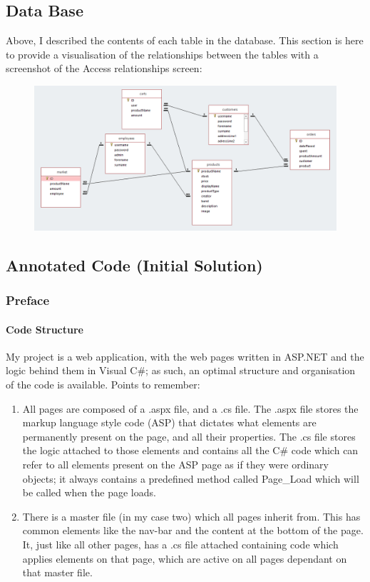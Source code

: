﻿\documentclass{article}
\begin{document}
    \subsection{Data Base}
    Above, I described the contents of each table in the database.
    This section is here to provide a visualisation of the relationships between the tables with a screenshot of the Access relationships screen:
    \begin{figure}[!h]
        \centering
        \includegraphics[width=\textwidth]{dataBaseScreen.png}
    \end{figure}
    \subsection{Annotated Code (Initial Solution)}
    \subsubsection{Preface}
    \paragraph{Code Structure}
    My project is a web application, with the web pages written in ASP.NET and the logic behind them in Visual C\#; as such, an optimal structure and organisation of the code is available.
    Points to remember:
    \begin{enumerate}
        \item All pages are composed of a .aspx file, and a .cs file.
        The .aspx file stores the markup language style code (ASP) that dictates what elements are permanently present on the page, and all their properties.
        The .cs file stores the logic attached to those elements and contains all the C\# code which can refer to all elements present on the ASP page as if they were ordinary objects; it always contains a predefined method called Page\_Load which will be called when the page loads.
        \item There is a master file (in my case two) which all pages inherit from.
        This has common elements like the nav-bar and the content at the bottom of the page.
        It, just like all other pages, has a .cs file attached containing code which applies elements on that page, which are active on all pages dependant on that master file.        
    \end{enumerate}
\end{document}
